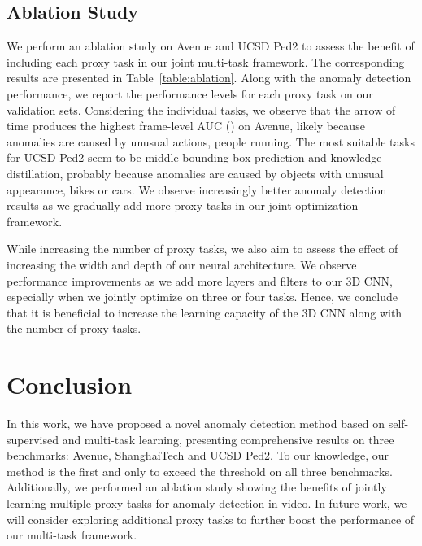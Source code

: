 \documentclass[final]{cvpr}
\begin{document}
\subsection{Ablation Study}
\vspace*{-0.1cm}

We perform an ablation study on Avenue and UCSD Ped2 to assess the benefit of including each proxy task in our joint multi-task framework. The corresponding results are presented in Table~\ref{table:ablation}. Along with the anomaly detection performance, we report the performance levels for each proxy task on our validation sets. Considering the individual tasks, we observe that the arrow of time produces the highest frame-level AUC () on Avenue, likely because anomalies are caused by unusual actions, \eg people running. The most suitable tasks for UCSD Ped2 seem to be middle bounding box prediction and knowledge distillation, probably because anomalies are caused by objects with unusual appearance, \eg bikes or cars.
We observe increasingly better anomaly detection results as we gradually add more proxy tasks in our joint optimization framework. 

While increasing the number of proxy tasks, we also aim to assess the effect of increasing the width and depth of our neural architecture. We observe performance improvements as we add more layers and filters to our 3D CNN, especially when we jointly optimize on three or four tasks. Hence, we conclude that it is beneficial to increase the learning capacity of the 3D CNN along with the number of proxy tasks. 



\vspace*{-0.1cm}
\section{Conclusion}
\label{sec_conclusion}
\vspace{-0.1cm}

In this work, we have proposed a novel anomaly detection method based on self-supervised and multi-task learning, presenting comprehensive results on three benchmarks: Avenue, ShanghaiTech and UCSD Ped2. To our knowledge, our method is the first and only to exceed the  threshold on all three benchmarks. Additionally, we performed an ablation study showing the benefits of jointly learning multiple proxy tasks for anomaly detection in video. In future work, we will consider exploring additional proxy tasks to further boost the performance of our multi-task framework.
\end{document}
